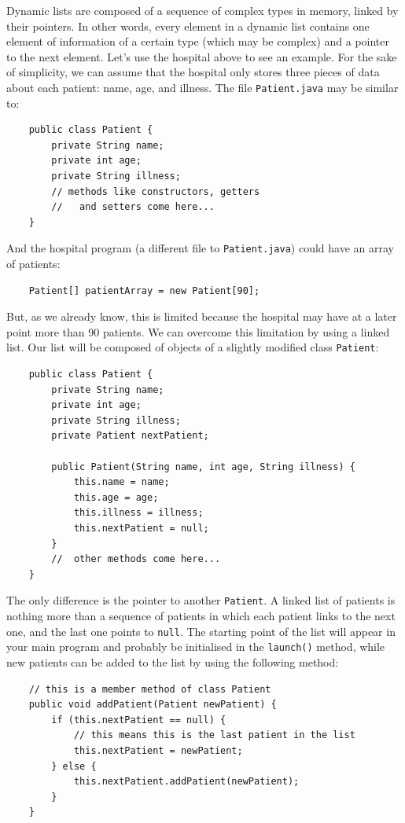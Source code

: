 Dynamic lists are composed of a sequence of complex types in memory,
linked by their pointers. In other words, every element in a dynamic
list contains one element of information of a certain type (which may
be complex) and a pointer to the next element. Let's use the hospital
above to see an example. For the sake of simplicity, we can assume
that the hospital only stores three pieces of data about each patient:
name, age, and illness. The file \verb+Patient.java+ may be similar to:

\begin{verbatim}
    public class Patient {
        private String name;
        private int age;
        private String illness;
        // methods like constructors, getters 
        //   and setters come here...
    }
\end{verbatim}

And the hospital program (a different file to \verb+Patient.java+)
could have an array of patients:  

\begin{verbatim}
    Patient[] patientArray = new Patient[90];
\end{verbatim}

But, as we already know, this is limited because the hospital may have
at a later point more than 90 patients. 
We can overcome this limitation by using a
linked list. Our list will be composed of objects of a slightly
modified class \verb+Patient+:

\begin{verbatim}
    public class Patient {
        private String name;
        private int age;
        private String illness;
        private Patient nextPatient;

        public Patient(String name, int age, String illness) {
            this.name = name;
            this.age = age;
            this.illness = illness;
            this.nextPatient = null;
        }
        //  other methods come here...
    }
\end{verbatim}

The only difference is the pointer to another \verb+Patient+. A linked
list of patients is nothing more than a sequence of patients in which
each patient links to the next one, and the last one 
points to \verb+null+. The starting point of the list will
appear in your main program and probably be initialised in the
\verb+launch()+ method, while new patients can be added to the list by
using the following method: 

\begin{verbatim}
    // this is a member method of class Patient
    public void addPatient(Patient newPatient) {
        if (this.nextPatient == null) {
            // this means this is the last patient in the list
            this.nextPatient = newPatient;
        } else {
            this.nextPatient.addPatient(newPatient);
        }
    }            
\end{verbatim}

